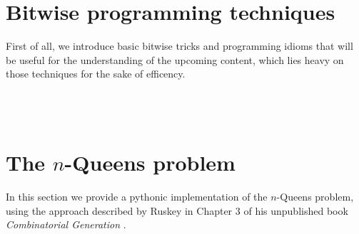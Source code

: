 
\section*{Bitwise programming techniques}

First of all, we introduce basic bitwise tricks and programming idioms that
will be useful for the understanding of the upcoming content, which lies heavy
on those techniques for the sake of efficency.

\inputminted[fontsize=\small,stripnl=false, firstline=193,lastline=206]{python}{backtracking/bits.py}
\inputminted[fontsize=\small,stripnl=false, firstline=208,lastline=221]{python}{backtracking/bits.py}
\inputminted[fontsize=\small,stripnl=false, firstline=268,lastline=280]{python}{backtracking/bits.py}
\inputminted[fontsize=\small,stripnl=false, firstline=265,lastline=266]{python}{backtracking/bits.py}

\section{The $n$-Queens problem}

In this section we provide a pythonic implementation of the $n$-Queens problem,
using the approach described by Ruskey 
in Chapter 3 of his unpublished book
\textit{Combinatorial Generation}
.

